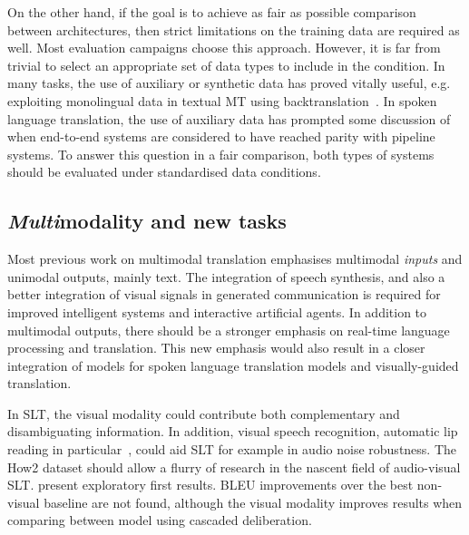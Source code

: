 \documentclass{svjour3}
\newcommand{\eg}[1]{\textit{e.g.}~#1}
\begin{document}
On the other hand, if the goal is to achieve as fair as possible comparison between architectures, then strict limitations on the training data are required as well.
Most evaluation campaigns choose this approach. However, it is far from trivial to select an appropriate set of data types to include in the condition. In many tasks, the use of auxiliary or synthetic data has proved vitally useful,
e.g. exploiting monolingual data in textual MT using backtranslation~\citep{sennrich2016improving}. In spoken language translation, the use of auxiliary data has prompted some discussion
of when end-to-end systems are considered to have reached parity with pipeline systems.
To answer this question in a fair comparison, both types of systems should be evaluated under standardised data conditions.

\subsection{\textit{Multi}modality and new tasks}

Most previous work on multimodal translation emphasises multimodal \textit{inputs} and unimodal outputs, mainly text. The integration of speech synthesis, and also a better integration of visual signals in generated communication is required for improved intelligent systems and interactive artificial agents. In addition to multimodal outputs, there should be a stronger emphasis on real-time language processing and translation. This new emphasis would also result in a closer integration of models for spoken language translation models and visually-guided translation.

In SLT, the visual modality could contribute both complementary and disambiguating information. In addition, visual speech recognition, automatic lip reading in particular~\citep[\eg{}][]{chung2017lip}, could aid SLT for example in audio noise robustness. The 
How2 dataset should allow a flurry of research in the nascent field of audio-visual SLT. \citet{wu2019transformer} present exploratory first results. BLEU improvements over the best non-visual baseline are not found, although the visual modality improves results when comparing between model using cascaded deliberation.
\end{document}
